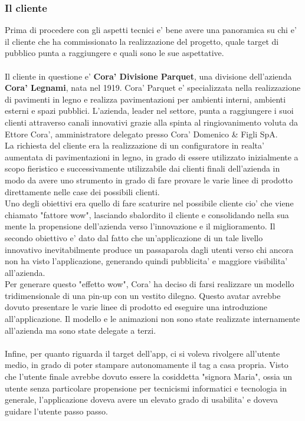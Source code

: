 \subsubsection{Il cliente}
Prima di procedere con gli aspetti tecnici e' bene avere una panoramica su chi e' il cliente che ha commissionato la realizzazione del progetto, quale target di pubblico punta a raggiungere e quali sono le sue aspettative.
\\\\
Il cliente in questione e' \textbf{Cora' Divisione Parquet}, una divisione dell'azienda \textbf{Cora' Legnami}, nata nel 1919. Cora' Parquet e' specializzata nella realizzazione di pavimenti in legno e realizza pavimentazioni per ambienti interni, ambienti esterni e spazi pubblici. L'azienda, leader nel settore, punta a raggiungere i suoi clienti attraverso canali innovativi grazie alla spinta al ringiovanimento voluta da Ettore Cora', amministratore delegato presso Cora' Domenico \& Figli SpA.\\
La richiesta del cliente era la realizzazione di un configuratore in realta' aumentata di pavimentazioni in legno, in grado di essere utilizzato inizialmente a scopo fieristico e successivamente utilizzabile dai clienti finali dell'azienda in modo da avere uno strumento in grado di fare provare le varie linee di prodotto direttamente nelle case dei possibili clienti.\\
Uno degli obiettivi era quello di fare scaturire nel possibile cliente cio' che viene chiamato "fattore wow", lasciando sbalordito il cliente e consolidando nella sua mente la propensione dell'azienda verso l'innovazione e il miglioramento.
Il secondo obiettivo e' dato dal fatto che un'applicazione di un tale livello innovativo inevitabilmente produce un passaparola dagli utenti verso chi ancora non ha visto l'applicazione, generando quindi pubblicita' e maggiore visibilita' all'azienda.\\
Per generare questo "effetto wow", Cora' ha deciso di farsi realizzare un modello tridimensionale di una pin-up con un vestito dilegno. Questo avatar avrebbe dovuto presentare le varie linee di prodotto ed eseguire una introduzione all'applicazione. Il modello e le animazioni non sono state realizzate internamente all'azienda ma sono state delegate a terzi.\\\\
Infine, per quanto riguarda il target dell'app, ci si voleva rivolgere all'utente medio, in grado di poter stampare autonomamente il tag a casa propria. Visto che l'utente finale avrebbe dovuto essere la cosiddetta "signora Maria", ossia un utente senza particolare propensione per tecnicismi informatici e tecnologia in generale, l'applicazione doveva avere un elevato grado di usabilita' e doveva guidare l'utente passo passo.

